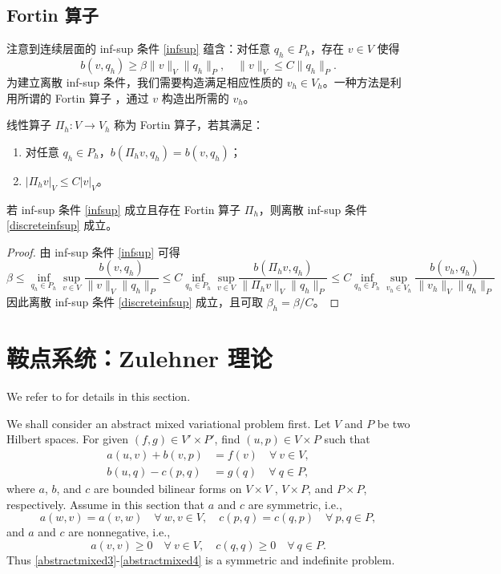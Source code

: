 \subsection{Fortin 算子}
注意到连续层面的 inf-sup 条件 \eqref{infsup} 蕴含：对任意 $q_h\in P_h$，存在 $v \in V$ 使得
$$
b(v, q_h)\geq\beta\|v\|_V\|q_h\|_P, \quad \|v\|_V\leq C\|q_h\|_P.
$$
为建立离散 inf-sup 条件，我们需要构造满足相应性质的 $v_h\in V_h$。一种方法是利用所谓的 Fortin 算子 \cite{Fortin1977}，通过 $v$ 构造出所需的 $v_h$。

\begin{defn}[Fortin 算子]
线性算子 $\Pi_h: V\to V_h$ 称为 Fortin 算子，若其满足：
\begin{enumerate}
\item 对任意 $q_h\in P_h$，$b(\Pi_hv, q_h) = b(v, q_h)$；
\item $|\Pi_hv|_V\leq C|v|_V$。
\end{enumerate}
\end{defn}

\begin{theorem}
若 inf-sup 条件 \eqref{infsup} 成立且存在 Fortin 算子 $\Pi_h$，则离散 inf-sup 条件 \eqref{discreteinfsup} 成立。
\end{theorem}
\begin{proof}
由 inf-sup 条件 \eqref{infsup} 可得
\[
\beta\leq \inf_{q_h\in P_h}\sup_{v\in V}\frac{b(v, q_h)}{\|v\|_V\|q_h\|_P}\leq C\inf_{q_h\in P_h}\sup_{v\in V}\frac{b(\Pi_hv, q_h)}{\|\Pi_hv\|_V\|q_h\|_P}\leq C\inf_{q_h\in P_h}\sup_{v_h\in V_h}\frac{b(v_h, q_h)}{\|v_h\|_V\|q_h\|_P}
\]
因此离散 inf-sup 条件 \eqref{discreteinfsup} 成立，且可取 $\beta_h=\beta/C$。
\end{proof}


\section{鞍点系统：Zulehner 理论}

We refer to \cite{Zulehner2011} for details in this section.

We shall consider an abstract mixed variational
problem first. Let $V$ and $P$ be two Hilbert spaces. For given $(f, g)\in V'\times P'$, find
$(u, p)\in V \times P$ such that
\begin{align}
a(u, v)+ b(v, p) & =f(v) \quad \forall~v\in V, \label{abstractmixed3}\\
b(u, q)-c(p,q) & =g(q)  \quad \forall~q\in P,\label{abstractmixed4}
\end{align}
where $a$, $b$, and $c$ are bounded bilinear forms on $V\times V$ , $V\times P$, and $P\times P$, respectively.
Assume in this section that $a$ and $c$ are symmetric, i.e.,
\[
a(w,v)=a(v,w)\quad\forall~w,v\in V,\quad c(p,q)=c(q,p)\quad\forall~p,q\in P,
\]
and $a$ and $c$ are nonnegative, i.e.,
\[
a(v,v)\geq0\quad\forall~v\in V, \quad c(q,q)\geq0\quad\forall~q\in P.
\]
Thus \eqref{abstractmixed3}-\eqref{abstractmixed4} is a symmetric and indefinite problem.

